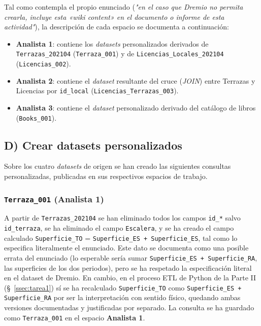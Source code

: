 \documentclass[11pt]{article}
\begin{document}
Tal como contempla el propio enunciado (\emph{"en el caso que Dremio no permita crearla,
incluye esta «wiki content» en el documento o informe de esta actividad"}), la descripción
de cada espacio se documenta a continuación:

\begin{itemize}
    \item \textbf{Analista 1}: contiene los \emph{datasets} personalizados derivados de
    \texttt{Terrazas\_202104} (\texttt{Terraza\_001}) y de
    \texttt{Licencias\_Locales\_202104} (\texttt{Licencias\_002}).
    \item \textbf{Analista 2}: contiene el \emph{dataset} resultante del cruce
    (\emph{JOIN}) entre Terrazas y Licencias por \texttt{id\_local}
    (\texttt{Licencias\_Terrazas\_003}).
    \item \textbf{Analista 3}: contiene el \emph{dataset} personalizado derivado del
    catálogo de libros (\texttt{Books\_001}).
\end{itemize}

\subsection{D) Crear datasets personalizados}

Sobre los cuatro \emph{datasets} de origen se han creado las siguientes consultas
personalizadas, publicadas en sus respectivos espacios de trabajo.

\subsubsection{\texttt{Terraza\_001} (Analista 1)}

A partir de \texttt{Terrazas\_202104} se han eliminado todos los campos \texttt{id\_*}
salvo \texttt{id\_terraza}, se ha eliminado el campo \texttt{Escalera}, y se ha creado el
campo calculado \texttt{Superficie\_TO} = \texttt{Superficie\_ES + Superficie\_ES}, tal
como lo especifica literalmente el enunciado. Este dato se documenta como una posible
errata del enunciado (lo esperable sería sumar \texttt{Superficie\_ES + Superficie\_RA},
las superficies de los dos periodos), pero se ha respetado la especificación literal en el
dataset de Dremio. En cambio, en el proceso ETL de Python de la Parte II (\S~\ref{ssec:tarea1})
sí se ha recalculado \texttt{Superficie\_TO} como \texttt{Superficie\_ES + Superficie\_RA}
por ser la interpretación con sentido físico, quedando ambas versiones documentadas y
justificadas por separado. La consulta se ha guardado como \texttt{Terraza\_001} en el
espacio \textbf{Analista 1}.
\end{document}
